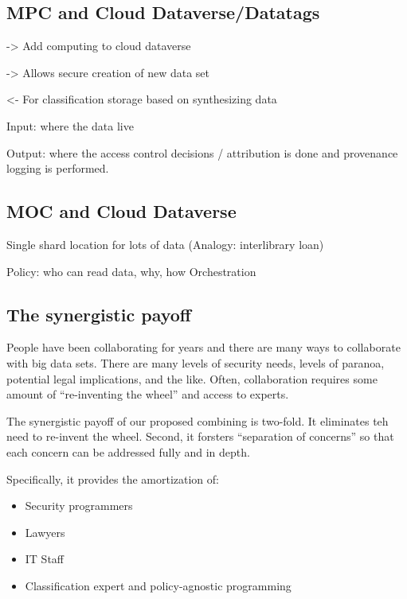 \subsection{MPC and Cloud Dataverse/Datatags}

->  Add computing to cloud dataverse

->  Allows secure creation of new data set

<-  For classification storage based on synthesizing data


Input:  where the data live

Output:  where the access control decisions / attribution is done and provenance logging is performed.


\subsection{MOC and Cloud Dataverse}

Single shard location for lots of data 
(Analogy:  interlibrary loan)

Policy:  who can read data, why, how
Orchestration



\subsection{The synergistic  payoff}

People have been collaborating for years and there are many ways to collaborate with big data sets.   There are many levels of security needs, levels of paranoa, potential legal implications, and the like.   Often, collaboration requires some amount of ``re-inventing the wheel'' and access to experts.

The synergistic payoff of our proposed combining is two-fold.  It eliminates teh need to re-invent the wheel.  Second, it forsters ``separation of concerns'' so that each concern can be addressed fully and in depth. 

Specifically, it provides the amortization of:
\begin{itemize}
\item Security programmers
\item Lawyers
\item IT Staff
\item Classification expert and policy-agnostic programming
\end{itemize}   